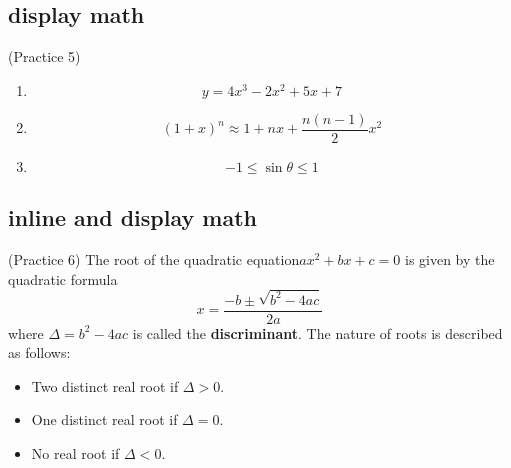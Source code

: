 \documentclass{article}
\begin{document}
	\subsection{display math}
	(Practice 5)
	\begin{enumerate}
		\item $$y = 4x^3 - 2x^2 + 5x + 7$$
		\item $$(1 + x)^n \approx 1 + nx + \frac{n(n - 1)}{2}x^2$$
		\item $$-1\leq \sin\theta \leq 1$$
	\end{enumerate}
	\subsection{inline and display math}
	(Practice 6) The root of the quadratic equation\(ax^2 + bx + c = 0\) is given by the quadratic formula$$x = \frac{-b\pm\sqrt{b^2 - 4ac}}{2a}$$ where $\Delta = b^2 - 4ac$ is called the \textbf{discriminant}. The nature of roots is described as follows:
	\begin{itemize}
		\item Two distinct real root if $\Delta > 0$.
		\item One distinct real root if $\Delta = 0$.
		\item No real root if $\Delta < 0$.
	\end{itemize}
\end{document}
